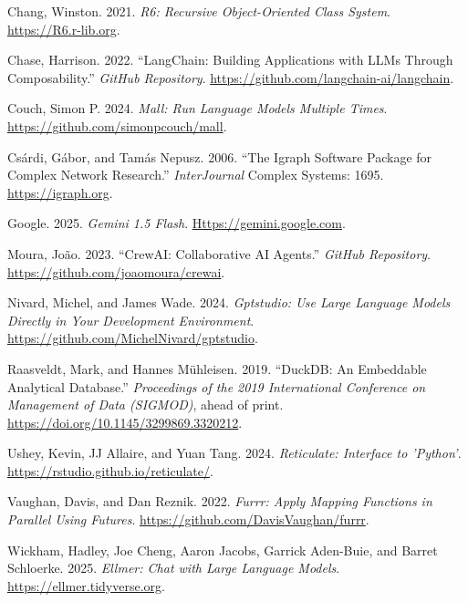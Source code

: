 \documentclass[10pt,a4paper,onecolumn]{article}
\newlength{\cslhangindent}
\newlength{\cslentryspacingunit} %
\newenvironment{CSLReferences}[2] %
 {%
  \setlength{\parindent}{0pt}
  \ifodd #1
  \let\oldpar\par
  \def\par{\hangindent=\cslhangindent\oldpar}
  \fi
  \setlength{\parskip}{#2\cslentryspacingunit}
 }%
 {}
\begin{document}
\protect{}\label{refs}
\begin{CSLReferences}{1}{1}
Chang, Winston. 2021. \emph{R6: Recursive Object-Oriented Class System}.
\url{https://R6.r-lib.org}.

Chase, Harrison. 2022. {``LangChain: Building Applications with LLMs
Through Composability.''} \emph{GitHub Repository}.
\url{https://github.com/langchain-ai/langchain}.

Couch, Simon P. 2024. \emph{Mall: Run Language Models Multiple Times}.
\url{https://github.com/simonpcouch/mall}.

Csárdi, Gábor, and Tamás Nepusz. 2006. {``The Igraph Software Package
for Complex Network Research.''} \emph{InterJournal} Complex Systems:
1695. \url{https://igraph.org}.

Google. 2025. \emph{Gemini 1.5 Flash}.
\href{https://gemini.google.com}{Https://gemini.google.com}.

Moura, João. 2023. {``CrewAI: Collaborative AI Agents.''} \emph{GitHub
Repository}. \url{https://github.com/joaomoura/crewai}.

Nivard, Michel, and James Wade. 2024. \emph{Gptstudio: Use Large
Language Models Directly in Your Development Environment}.
\url{https://github.com/MichelNivard/gptstudio}.

Raasveldt, Mark, and Hannes Mühleisen. 2019. {``DuckDB: An Embeddable
Analytical Database.''} \emph{Proceedings of the 2019 International
Conference on Management of Data (SIGMOD)}, ahead of print.
\url{https://doi.org/10.1145/3299869.3320212}.

Ushey, Kevin, JJ Allaire, and Yuan Tang. 2024. \emph{Reticulate:
Interface to 'Python'}. \url{https://rstudio.github.io/reticulate/}.

Vaughan, Davis, and Dan Reznik. 2022. \emph{Furrr: Apply Mapping
Functions in Parallel Using Futures}.
\url{https://github.com/DavisVaughan/furrr}.

Wickham, Hadley, Joe Cheng, Aaron Jacobs, Garrick Aden-Buie, and Barret
Schloerke. 2025. \emph{Ellmer: Chat with Large Language Models}.
\url{https://ellmer.tidyverse.org}.

\end{CSLReferences}
\end{document}
